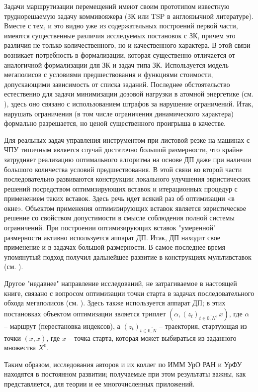 \documentclass[12pt]{report}
\begin{document}
{{Задачи маршрутизации перемещений имеют своим прототипом известную труднорешаемую задачу коммивояжера (ЗК или TSP в англоязычной литературе). Вместе с тем, и это видно уже из содержательных построений первой части, имеются существенные различия исследуемых постановок с ЗК, причем это различия не только количественного, но и качественного характера. В этой связи возникает потребность в формализации, которая существенно отличается от аналогичной формализации для ЗК и задач типа ЗК. Используется модель мегаполисов с условиями предшествования и функциями стоимости, допускающими зависимость от списка заданий. Последнее обстоятельство естественно для задачи минимизации дозовой нагрузки в атомной энергетике (см. \cite{Cha2`}), здесь оно связано с использованием штрафов за нарушение ограничений. Итак, нарушать ограничения (в том числе ограничения динамического характера) формально разрешается, но ценой существенного проигрыша в качестве.

Для реальных задач управления инструментом при листовой резке на машинах с ЧПУ типичным является случай достаточно большой размерности, что крайне затрудняет реализацию оптимального алгоритма на основе ДП даже при наличии большого количества условий предшествования. В этой связи во второй части последовательно развиваются конструкции локального улучшения эвристических решений посредством оптимизирующих вставок и итерационных процедур с применением таких вставок. Здесь речь идет всякий раз об оптимизации «в окне». Объектом применения оптимизирующих вставок является эвристическое решение со свойством допустимости в смысле соблюдения полной системы ограничений. При построении оптимизирующих вставок "умеренной"\; размерности активно используется аппарат ДП. Итак, ДП находит свое применение и в задачах большой размерности. В самое последнее время упомянутый подход получил дальнейшее развитие в конструкциях мультивставок (см. \cite{ChenGrig, ChenChenGrig}).

Другое "недавнее"\; направление исследований, не затрагиваемое в настоящей книге, связано с вопросом оптимизации точки старта в задачах последовательного обхода мегаполисов (см. \cite{StartPoint,StartFinishPoint,ChenChen}). Здесь также используется аппарат ДП; в этих постановках объектом оптимизации звляется триплет $(\alpha,(z_t)_{t\in \overline{0,N}},x)$, где $\alpha$ -- маршрут (перестановка индексов), а $(z_t)_{t\in \overline{0,N}}$ -- траектория, стартующая из точки $(x,x)$, где $x$ -- точка старта, которая может выбираться из заданного множества $X^0$.

Таким образом, исследования авторов и их коллег по ИММ УрО РАН и УрФУ находятся в постоянном развитии; получаемые при этом результаты важны, как представляется, для теории и ее многочисленных приложений.











}}
\end{document}
